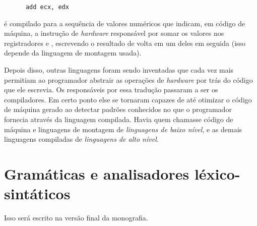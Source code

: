    \begin{verbatim}
      add ecx, edx\end{verbatim}

    \hspace{-16pt}é compilado para a sequência de valores numéricos que indicam,
    em código de máquina, a instrução de \emph{hardware} responsável por somar os
    valores nos registradores  e , escrevendo o resultado de
    volta em um deles em seguida (isso depende da linguagem de montagem usada).

    Depois disso, outras linguagens foram sendo inventadas que cada vez mais
    permitiam ao programador abstrair as operações de \emph{hardware} por trás
    do código que ele escrevia. Os responsáveis por essa tradução passaram a ser
    os compiladores. Em certo ponto else se tornaram capazes de até otimizar o
    código de máquina gerado ao detectar padrões conhecidos no que o programador
    fornecia através da linguagem compilada. Havia quem chamasse código de máquina
    e linguagens de montagem de \emph{linguagens de baixo nível}, e as demais
    linguagens compiladas de \emph{linguagens de alto nível}.


  \section{Gramáticas e analisadores léxico-sintáticos}
  \label{cap:conceitos:gramaticas}

    Isso será escrito na versão final da monografia.

